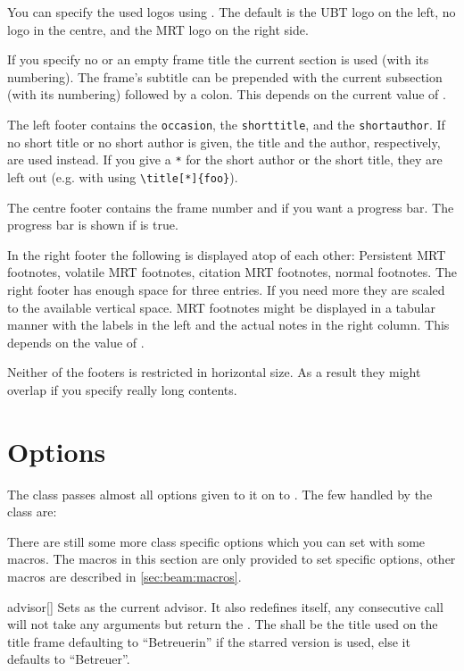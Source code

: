 You can specify the used logos using . The default is the UBT logo
on the left, no logo in the centre, and the MRT logo on the right side.

If you specify no or an empty frame title the current section is used (with its
numbering). The frame's subtitle can be prepended with the current subsection
(with its numbering) followed by a colon. This depends on the current value of
.

The left footer contains the \texttt{occasion}, the \texttt{shorttitle}, and the
\texttt{shortauthor}. If no short title or no short author is given, the title
and the author, respectively, are used instead. If you give a \texttt{*} for the
short author or the short title, they are left out (e.g. with using
\verb|\title[*]{foo}|).

The centre footer contains the frame number and if you want a progress bar. The
progress bar is shown if  is true.

In the right footer the following is displayed atop of each other: Persistent
MRT footnotes, volatile MRT footnotes, citation MRT footnotes, normal footnotes.
The right footer has enough space for three entries. If you need more they are
scaled to the available vertical space. MRT footnotes might be displayed in a
tabular manner with the labels in the left and the actual notes in the right
column. This depends on the value of .

Neither of the footers is restricted in horizontal size. As a result they might
overlap if you specify really long contents.

\section{Options}
The class passes almost all options given to it on to . The few
handled by the class are:



There are still some more class specific options which you can set with some
macros. The macros in this section are only provided to set specific options,
other macros are described in \autoref{sec:beam:macros}.

\begin{describemacro}{advisor}[\meta{*}]
  Sets  as the current advisor. It also redefines itself, any
  consecutive call will not take any arguments but return the . The
   shall be the title used on the title frame defaulting to
  \enquote{Betreuerin} if the starred version is used, else it defaults to
  \enquote{Betreuer}.
\end{describemacro}

